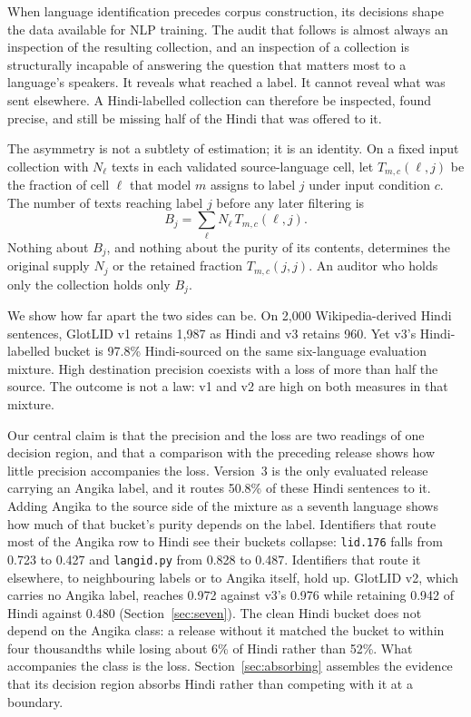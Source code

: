 \documentclass[final]{clv2025}
\newcommand{\lab}[1]{\texttt{#1}}
\begin{document}
When language identification precedes corpus construction, its decisions shape the data available for NLP training. The audit that follows is almost always an inspection of the resulting collection, and an inspection of a collection is structurally incapable of answering the question that matters most to a language's speakers. It reveals what reached a label. It cannot reveal what was sent elsewhere. A Hindi-labelled collection can therefore be inspected, found precise, and still be missing half of the Hindi that was offered to it.

The asymmetry is not a subtlety of estimation; it is an identity. On a fixed input collection with $N_\ell$ texts in each validated source-language cell, let $T_{m,c}(\ell,j)$ be the fraction of cell $\ell$ that model $m$ assigns to label $j$ under input condition $c$. The number of texts reaching label $j$ before any later filtering is
\begin{equation}\label{eq:identity}
B_j=\sum_\ell N_\ell\,T_{m,c}(\ell,j).
\end{equation}
Nothing about $B_j$, and nothing about the purity of its contents, determines the original supply $N_j$ or the retained fraction $T_{m,c}(j,j)$. An auditor who holds only the collection holds only $B_j$.

We show how far apart the two sides can be. On 2,000 Wikipedia-derived Hindi sentences, GlotLID v1 retains 1,987 as Hindi and v3 retains 960. Yet v3's Hindi-labelled bucket is 97.8\% Hindi-sourced on the same six-language evaluation mixture. High destination precision coexists with a loss of more than half the source. The outcome is not a law: v1 and v2 are high on both measures in that mixture.

Our central claim is that the precision and the loss are two readings of one decision region, and that a comparison with the preceding release shows how little precision accompanies the loss. Version~3 is the only evaluated release carrying an Angika label, and it routes 50.8\% of these Hindi sentences to it. Adding Angika to the source side of the mixture as a seventh language shows how much of that bucket's purity depends on the label. Identifiers that route most of the Angika row to Hindi see their buckets collapse: \lab{lid.176} falls from 0.723 to 0.427 and \texttt{langid.py} from 0.828 to 0.487. Identifiers that route it elsewhere, to neighbouring labels or to Angika itself, hold up. GlotLID v2, which carries no Angika label, reaches 0.972 against v3's 0.976 while retaining 0.942 of Hindi against 0.480 (Section~\ref{sec:seven}). The clean Hindi bucket does not depend on the Angika class: a release without it matched the bucket to within four thousandths while losing about 6\% of Hindi rather than 52\%. What accompanies the class is the loss. Section~\ref{sec:absorbing} assembles the evidence that its decision region absorbs Hindi rather than competing with it at a boundary.
\end{document}
